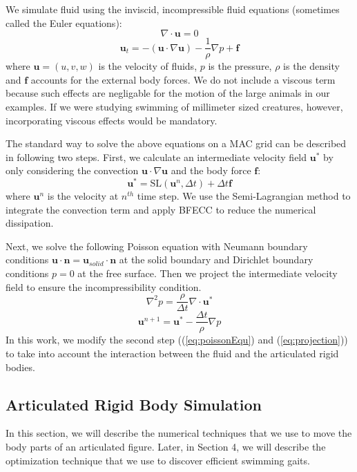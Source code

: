 We simulate fluid using the inviscid, incompressible fluid equations
(sometimes called the Euler equations):
\begin{displaymath}
 \nabla\cdot\mathbf{u}=0
\end{displaymath}
\begin{displaymath}
 \mathbf{u}_t=-(\mathbf{u}\cdot\nabla\mathbf{u})-\frac{1}{\rho}\nabla
 p+\mathbf{f}
\end{displaymath}
where $\mathbf{u}=(u,v,w)$ is the velocity of fluids, $p$ is the pressure,
$\rho$ is the density and $\mathbf{f}$ accounts for the external body
forces.  We do not include a viscous term because such effects are
negligable for the motion of the large animals in our examples.  If we
were studying swimming of millimeter sized creatures, however,
incorporating viscous effects would be mandatory.

The standard way to solve the above equations on a MAC grid can be described in following two steps. First, we calculate an intermediate velocity field $\mathbf{u}^*$ by only considering the convection $\mathbf{u}\cdot\nabla\mathbf{u}$ and the body force $\mathbf{f}$:
\begin{equation}
 \mathbf{u}^*=\textrm{SL}(\mathbf{u}^n,\Delta t)+\Delta t\mathbf{f}
\label{eq:sl}
\end{equation}
where $\mathbf{u}^n$ is the velocity at $n^{th}$ time step.
We use the Semi-Lagrangian method \cite{stam99stablefluids} to integrate the convection term and apply BFECC \cite{kim06advectionswith} to reduce the numerical dissipation.

Next, we solve the following Poisson equation with Neumann boundary conditions $\mathbf{u}\cdot\mathbf{n}=\mathbf{u}_{solid}\cdot\mathbf{n}$ at the solid boundary and Dirichlet
boundary conditions $p = 0$ at the free surface. Then we project the intermediate velocity field to ensure the incompressibility condition.
\begin{equation}
\label{eq:poissonEqu}
 \nabla^2 p=\frac{\rho}{\Delta t}\nabla\cdot\mathbf{u}^*
\end{equation}
\begin{equation}
\label{eq:projection}
 \mathbf{u}^{n+1}=\mathbf{u}^*-\frac{\Delta t}{\rho}\nabla p
\end{equation}
In this work, we modify the second step ((\ref{eq:poissonEqu}) and (\ref{eq:projection})) to take into account the interaction between the fluid and the articulated rigid bodies.

\subsection{Articulated Rigid Body Simulation}
In this section, we will describe the numerical techniques that we use to move the body parts of an articulated figure. Later, in Section 4, we will describe the optimization technique that we use to discover efficient swimming gaits.

